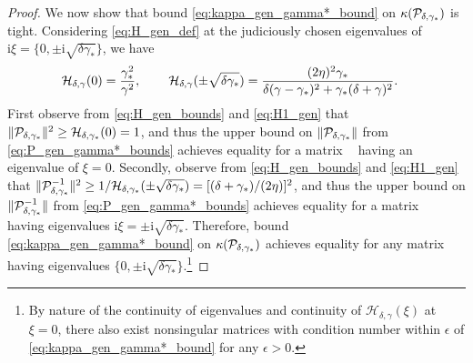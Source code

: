 \documentclass[review]{siamart}
\DeclareMathOperator{\cL}{\widehat{\mathcal{L}}}
\begin{document}
\begin{proof}
We now show that bound \eqref{eq:kappa_gen_gamma*_bound} on $\kappa({\cal P}_{\delta,\gamma_*})$
is tight. Considering \eqref{eq:H_gen_def} at the judiciously chosen eigenvalues of
$\mathrm{i} \xi = \{ 0, \pm \mathrm{i} \sqrt{\delta \gamma_*}\}$, we have
%
\begin{align}
\label{eq:H1_gen}
{\cal H}_{\delta,\gamma}(0) 
	&= \frac{\gamma_*^2}{\gamma^2}, 
\hspace{5ex}
{\cal H}_{\delta,\gamma}(\pm \sqrt{\delta \gamma_*}) = 
	\frac{(2 \eta)^2 \gamma_*}{\delta( \gamma- \gamma_*)^2 + \gamma_* (\delta + \gamma)^2 }.
\end{align}
%
First observe from \eqref{eq:H_gen_bounds} and \eqref{eq:H1_gen} that $\Vert {\cal
P}_{\delta,\gamma_*} \Vert^2 \geq {\cal H}_{\delta,\gamma_*}(0) = 1$, and thus the upper bound
on $\Vert {\cal P}_{\delta,\gamma_*} \Vert$ from \eqref{eq:P_gen_gamma*_bounds} achieves
equality for a matrix $\cL$ having an eigenvalue of $\xi = 0$.
Secondly, observe from \eqref{eq:H_gen_bounds} and \eqref{eq:H1_gen} that $\Vert {\cal
P}_{\delta,\gamma_*}^{-1} \Vert^2 \geq 1/{\cal H}_{\delta,\gamma_*}(\pm \sqrt{\delta  \gamma_*})= [(\delta + \gamma_*)/(2\eta)]^2$, and thus the upper bound on $\Vert {\cal
P}_{\delta,\gamma_*}^{-1} \Vert$ from \eqref{eq:P_gen_gamma*_bounds} achieves equality for
a matrix $\cL$ having eigenvalues $\mathrm{i} \xi = \pm \mathrm{i} \sqrt{\delta \gamma_*}$.
Therefore, bound \eqref{eq:kappa_gen_gamma*_bound} on $\kappa({\cal P}_{\delta,\gamma_*})$
achieves equality for any matrix $\cL$ having eigenvalues $\{0, \pm
\mathrm{i}\sqrt{\delta \gamma_*}\}$.\footnote{By nature of the continuity of
eigenvalues and continuity of $\mathcal{H}_{\delta,\gamma}(\xi)$ at $\xi = 0$, there
also exist nonsingular matrices with condition number within
$\epsilon$ of \eqref{eq:kappa_gen_gamma*_bound} for any $\epsilon > 0$.}


\end{proof}
\end{document}
